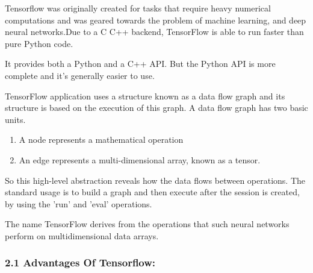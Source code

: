\documentclass[11pt]{article}
\providecommand{\tightlist}{%
      \setlength{\itemsep}{0pt}\setlength{\parskip}{0pt}}
\begin{document}
Tensorflow was originally created for tasks that require heavy numerical
computations and was geared towards the problem of machine learning, and
deep neural networks.Due to a C C++ backend, TensorFlow is able to run
faster than pure Python code.

It provides both a Python and a C++ API. But the Python API is more
complete and it's generally easier to use.

TensorFlow application uses a structure known as a data flow graph and
its structure is based on the execution of this graph. A data flow graph
has two basic units.

\begin{enumerate}
\def\labelenumi{\arabic{enumi}.}
\tightlist
\item
  A node represents a mathematical operation
\item
  An edge represents a multi-dimensional array, known as a tensor.
\end{enumerate}

So this high-level abstraction reveals how the data flows between
operations. The standard usage is to build a graph and then execute
after the session is created, by using the 'run' and 'eval' operations.

The name TensorFlow derives from the operations that such neural
networks perform on multidimensional data arrays.

    \subsubsection{2.1 Advantages Of
Tensorflow:}\label{advantages-of-tensorflow}
\end{document}
